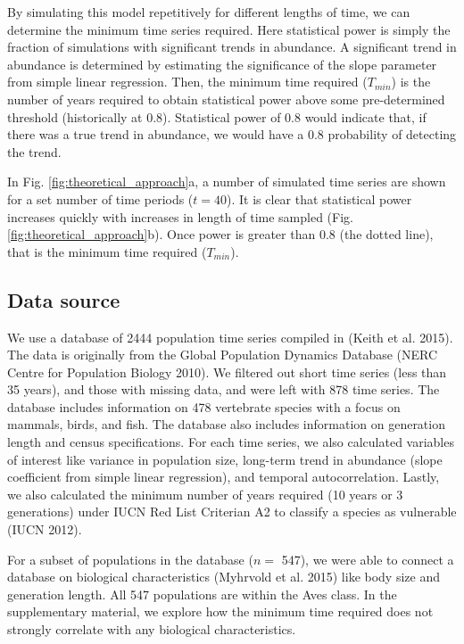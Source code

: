 \documentclass[12pt,]{article}
\begin{document}
By simulating this model repetitively for different lengths of time, we
can determine the minimum time series required. Here statistical power
is simply the fraction of simulations with significant trends in
abundance. A significant trend in abundance is determined by estimating
the significance of the slope parameter from simple linear regression.
Then, the minimum time required (\(T_{min}\)) is the number of years
required to obtain statistical power above some pre-determined threshold
(historically at 0.8). Statistical power of 0.8 would indicate that, if
there was a true trend in abundance, we would have a 0.8 probability of
detecting the trend.

In Fig. \ref{fig:theoretical_approach}a, a number of simulated time
series are shown for a set number of time periods (\(t=40\)). It is
clear that statistical power increases quickly with increases in length
of time sampled (Fig. \ref{fig:theoretical_approach}b). Once power is
greater than 0.8 (the dotted line), that is the minimum time required
(\(T_{min}\)).

\subsection{Data source}\label{data-source}

We use a database of 2444 population time series compiled in (Keith et
al. 2015). The data is originally from the Global Population Dynamics
Database (NERC Centre for Population Biology 2010). We filtered out
short time series (less than 35 years), and those with missing data, and
were left with 878 time series. The database includes information on 478
vertebrate species with a focus on mammals, birds, and fish. The
database also includes information on generation length and census
specifications. For each time series, we also calculated variables of
interest like variance in population size, long-term trend in abundance
(slope coefficient from simple linear regression), and temporal
autocorrelation. Lastly, we also calculated the minimum number of years
required (10 years or 3 generations) under IUCN Red List Criterian A2 to
classify a species as vulnerable (IUCN 2012).

For a subset of populations in the database (\(n =\) 547), we were able
to connect a database on biological characteristics (Myhrvold et al.
2015) like body size and generation length. All 547 populations are
within the Aves class. In the supplementary material, we explore how the
minimum time required does not strongly correlate with any biological
characteristics.
\end{document}

